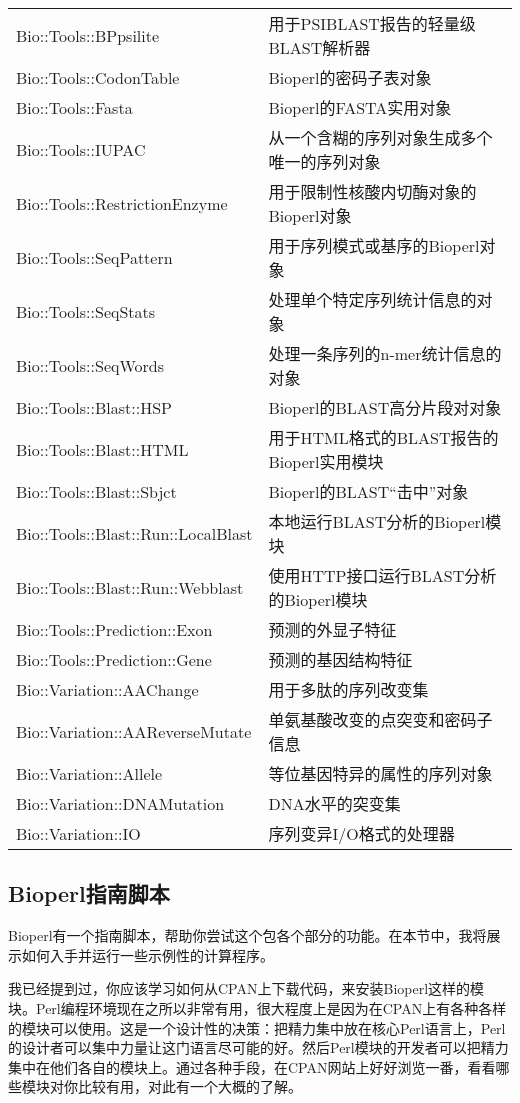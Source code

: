 \begin{table}[!htbp]
\begin{center}
\begin{tabu}{X[2,l]X[3,l]}
  Bio::Tools::BPpsilite & 用于PSIBLAST报告的轻量级BLAST解析器\\
  Bio::Tools::CodonTable & Bioperl的密码子表对象\\
  Bio::Tools::Fasta & Bioperl的FASTA实用对象\\
  Bio::Tools::IUPAC & 从一个含糊的序列对象生成多个唯一的序列对象\\
  Bio::Tools::RestrictionEnzyme & 用于限制性核酸内切酶对象的Bioperl对象\\
  Bio::Tools::SeqPattern & 用于序列模式或基序的Bioperl对象\\
  Bio::Tools::SeqStats & 处理单个特定序列统计信息的对象\\
  Bio::Tools::SeqWords & 处理一条序列的n-mer统计信息的对象\\
  Bio::Tools::Blast::HSP & Bioperl的BLAST高分片段对对象\\
  Bio::Tools::Blast::HTML & 用于HTML格式的BLAST报告的Bioperl实用模块\\
  Bio::Tools::Blast::Sbjct & Bioperl的BLAST“击中”对象\\
  Bio::Tools::Blast::Run::LocalBlast & 本地运行BLAST分析的Bioperl模块\\
  Bio::Tools::Blast::Run::Webblast & 使用HTTP接口运行BLAST分析的Bioperl模块\\
  Bio::Tools::Prediction::Exon & 预测的外显子特征\\
  Bio::Tools::Prediction::Gene & 预测的基因结构特征\\
  Bio::Variation::AAChange & 用于多肽的序列改变集\\
  Bio::Variation::AAReverseMutate & 单氨基酸改变的点突变和密码子信息\\
  Bio::Variation::Allele & 等位基因特异的属性的序列对象\\
  Bio::Variation::DNAMutation & DNA水平的突变集\\
  Bio::Variation::IO & 序列变异I/O格式的处理器\\
  \bottomrule
  \end{tabu}
  \end{center}
\end{table}

\subsection{Bioperl指南脚本}
Bioperl有一个指南脚本，帮助你尝试这个包各个部分的功能。在本节中，我将展示如何入手并运行一些示例性的计算程序。

我已经提到过，你应该学习如何从CPAN上下载代码，来安装Bioperl这样的模块。Perl编程环境现在之所以非常有用，很大程度上是因为在CPAN上有各种各样的模块可以使用。这是一个设计性的决策：把精力集中放在核心Perl语言上，Perl的设计者可以集中力量让这门语言尽可能的好。然后Perl模块的开发者可以把精力集中在他们各自的模块上。通过各种手段，在CPAN网站上好好浏览一番，看看哪些模块对你比较有用，对此有一个大概的了解。

